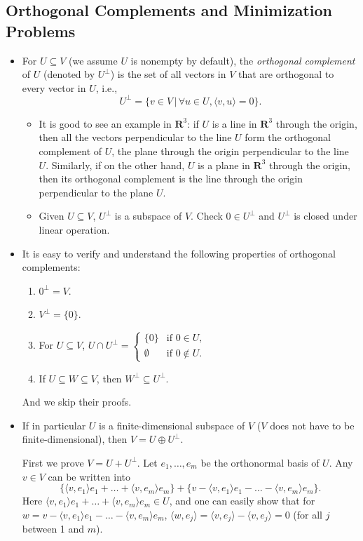 \documentclass[11pt]{article}
\newcommand{\where}{\,|\,}
\newcommand{\df}[1]{\textit{\textsf{#1}}}
\newcommand{\R}{\mathbf{R}}
\newcommand{\inp}[2]{\langle #1, #2 \rangle}
\begin{document}
\subsection{Orthogonal Complements and Minimization Problems}
\begin{itemize}
    \item For $U \subseteq V$ (we assume $U$ is nonempty by default), the \df{orthogonal complement} of $U$ (denoted by $U^\perp$) is the set of all vectors in $V$ that are orthogonal to every vector in $U$, i.e., $$U^\perp = \{v \in V \where \forall u \in U, \inp{v}{u}=0\}.$$
    \begin{itemize}
        \item It is good to see an example in $\R^3$: if $U$ is a line in $\R^3$ through the origin, then all the vectors perpendicular to the line $U$ form the orthogonal complement of $U$, the plane through the origin perpendicular to the line $U$. Similarly, if on the other hand, $U$ is a plane in $\R^3$ through the origin, then its orthogonal complement is the line through the origin perpendicular to the plane $U$.
        \item Given $U \subseteq V$, $U^\perp$ is a subspace of $V$. Check $0 \in U^\perp$ and $U^\perp$ is closed under linear operation.
    \end{itemize}
    \item It is easy to verify and understand the following properties of orthogonal complements:
    \begin{enumerate}[label=(\alph*)]
        \item $0^\perp = V$.
        \item $V^\perp = \{0\}$.
        \item For $U \subseteq V$, $U \cap U^\perp = \left\{\begin{array}{rl} \{0\} & \text{if } 0 \in U, \\ \emptyset \;\, & \text{if } 0 \notin U. \end{array} \right.$
        \item If $U \subseteq W \subseteq V$, then $W^\perp \subseteq U^\perp$.
    \end{enumerate}
    And we skip their proofs.
    \item If in particular $U$ is a finite-dimensional subspace of $V$ ($V$ does not have to be finite-dimensional), then $V = U \oplus U^\perp$.
    
    First we prove $V = U + U^\perp$. Let $e_1,\dots,e_m$ be the orthonormal basis of $U$. Any $v \in V$ can be written into $$\{\inp{v}{e_1}e_1+\dots+\inp{v}{e_m}e_m\} + \{v - \inp{v}{e_1}e_1-\dots-\inp{v}{e_m}e_m\}.$$ Here $\inp{v}{e_1}e_1+\dots+\inp{v}{e_m}e_m \in U$, and one can easily show that for $w = v - \inp{v}{e_1}e_1-\dots-\inp{v}{e_m}e_m$, $\inp{w}{e_j} = \inp{v}{e_j} - \inp{v}{e_j} = 0$ (for all $j$ between 1 and $m$).
    

\end{itemize}
\end{document}
